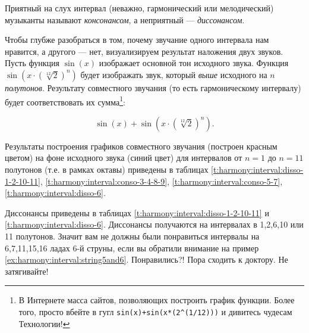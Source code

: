 Приятный на слух интервал (неважно, гармонический или мелодический) музыканты называют \emph{консонансом}, а неприятный --- \emph{диссонансом}. 

Чтобы глубже разобраться в том, почему звучание одного интервала нам нравится, а другого --- нет, визуализируем результат наложения двух звуков. Пусть функция $\sin(x)$ изображает основной тон исходного звука. Функция $\sin(x\cdot(\sqrt[12]{2})^n)$ будет изображать звук, который \emph{выше} исходного на $n$ \emph{полутонов}. Результату совместного звучания (то есть гармоническому интервалу) будет соответствовать их сумма\footnote{В Интернете масса сайтов, позволяющих построить график функции. Более того, просто вбейте в гугл \texttt{sin(x)+sin(x*(2\^{}(1/12)))} и дивитесь чудесам Технологии!}:

\begin{equation}
    \label{eq:harmony:interval:sin}
    \sin(x) + \sin(x\cdot(\sqrt[12]{2})^n).
\end{equation}

Результаты построения графиков совместного звучания (построен красным цветом) на фоне исходного звука (синий цвет) для интервалов от $n=1$ до $n=11$ полутонов (т.е. в рамках октавы) приведены в таблицах \ref{t:harmony:interval:disso-1-2-10-11}, \ref{t:harmony:interval:conso-3-4-8-9}, \ref{t:harmony:interval:conso-5-7}, \ref{t:harmony:interval:disso-6}.

Диссонансы приведены в таблицах \ref{t:harmony:interval:disso-1-2-10-11} и \ref{t:harmony:interval:disso-6}. Диссонансы получаются на интервалах в 1,2,6,10 или 11 полутонов. Значит вам не должны были понравиться интервалы на 6,7,11,15,16 ладах 6-й струны, если вы обратили внимание на пример \ref{ex:harmony:interval:string5and6}. Понравились?! Пора сходить к доктору. Не затягивайте! 

